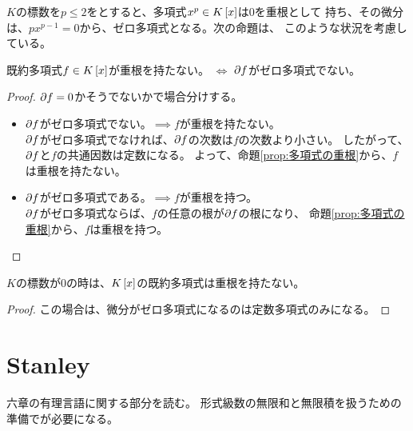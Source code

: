 {	$K$の標数を$p\le2$をとすると、多項式$x^p\in K\mathinner{[{x}]}$は$0$を重根として
	持ち、その微分は、$px^{p-1}=0$から、ゼロ多項式となる。次の命題は、
	このような状況を考慮している。

	\begin{proposition}[多項式の重根その二]\label{prop:多項式の重根その二} %
		既約多項式$f\in K\mathinner{[{x}]}$が重根を持たない。
		$\iff$ ${\partial} f$がゼロ多項式でない。
	\end{proposition} %
	\begin{proof} %
		${\partial} f=0$かそうでないかで場合分けする。
		\begin{itemize}\setlength{\itemsep}{-1mm} %
			\item ${\partial} f$がゼロ多項式でない。$\implies$$f$が重根を持たない。 \\
			${\partial} f$がゼロ多項式でなければ、${\partial} f$の次数は$f$の次数より小さい。
			したがって、${\partial} f$と$f$の共通因数は定数になる。
			よって、命題\ref{prop:多項式の重根}から、$f$は重根を持たない。
			\item ${\partial} f$がゼロ多項式である。$\implies$$f$が重根を持つ。 \\
			${\partial} f$がゼロ多項式ならば、$f$の任意の根が${\partial} f$の根になり、
			命題\ref{prop:多項式の重根}から、$f$は重根を持つ。
		\end{itemize} %
	\end{proof} %

	\begin{proposition}[多項式の重根その三]\label{prop:多項式の重根その三} %
		$K$の標数が$0$の時は、$K\mathinner{[{x}]}$の既約多項式は重根を持たない。
	\end{proposition} %
	\begin{proof} %
		この場合は、微分がゼロ多項式になるのは定数多項式のみになる。
	\end{proof} %
\section{Stanley}\label{s1:Stanley} %
	\cite{stanley-2}六章の有理言語に関する部分を読む。
	形式級数の無限和と無限積を扱うための準備で\cite{stanley-1}が必要になる。

}
